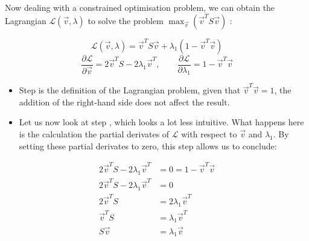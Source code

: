 Now dealing with a constrained optimisation problem, we can obtain the Lagrangian $\mathcal{L}(\overrightarrow{v}, \lambda)$ to solve the problem $\max_{\overrightarrow{v}} (\overrightarrow{v}^T S \overrightarrow{v})$ \cite{deisenroth2020mathematics}:

\begin{equation}
	\label{formula:maxOptimisationI}
	\mathcal{L}(\overrightarrow{v}, \lambda) = \overrightarrow{v}^T S \overrightarrow{v} + \lambda_1 (1 - \overrightarrow{v}^T\overrightarrow{v})
\end{equation}
\begin{equation}
	\label{formula:maxOptimisationII}
	\frac{\partial \mathcal{L}}{\partial \overrightarrow{v}} = 2 \overrightarrow{v}^T S - 2 \lambda_1 \overrightarrow{v}^T,
	\quad \quad
	\frac{\partial \mathcal{L}}{\partial \lambda_1} = 1 - \overrightarrow{v}^T \overrightarrow{v}
\end{equation}

\vspace{2mm}

\begin{itemize}
	\item Step  is the definition of the Lagrangian problem, given that $\overrightarrow{v}^T\overrightarrow{v}=1$, the addition of the right-hand side does not affect the result.
	\item Let us now look at step , which looks a lot less intuitive. 
	What happens here is the calculation the partial derivates of $\mathcal{L}$ with respect to $\overrightarrow{v}$ and $\lambda_1$.
	By setting these partial derivates to zero, this step allows us to conclude:
\end{itemize}

\vspace{-16mm}
{
\begin{align}
	\label{formula:maxOptimisationIII}
	2 \overrightarrow{v}^T S - 2 \lambda_1 \overrightarrow{v}^T &= 0 = 1 - \overrightarrow{v}^T \overrightarrow{v}
	\\
	\label{formula:maxOptimisationIV}
	2 \overrightarrow{v}^T S - 2 \lambda_1 \overrightarrow{v}^T &= 0
	\\
	\label{formula:maxOptimisationV}
	2 \overrightarrow{v}^T S &= 2 \lambda_1 \overrightarrow{v}^T
	\\
	\label{formula:maxOptimisationVI}
	\overrightarrow{v}^T S &= \lambda_1 \overrightarrow{v}^T
	\\
	\label{formula:maxOptimisationVII}
	S \overrightarrow{v} &= \lambda_1 \overrightarrow{v}
\end{align}
}

